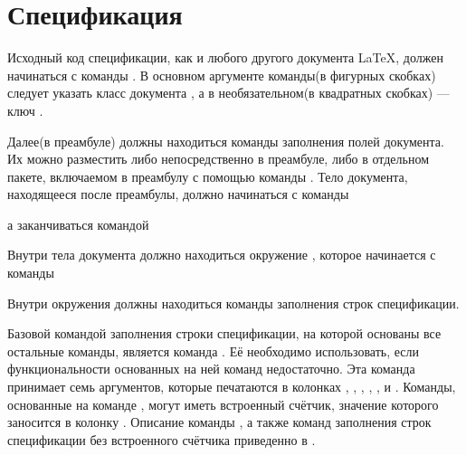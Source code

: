 
\section{Спецификация}

Исходный код спецификации, как и любого другого документа \LaTeX{}, должен
начинаться с команды . В основном аргументе
команды(в фигурных скобках) следует указать класс документа , а в
необязательном(в квадратных скобках) --- ключ .


Далее(в преамбуле) должны находиться команды заполнения полей документа. Их можно
разместить либо непосредственно в преамбуле, либо в отдельном пакете, включаемом в
преамбулу с помощью команды . Тело документа,
находящееся после преамбулы, должно начинаться с команды

\begin{pcbdoccode}

\end{pcbdoccode}

а заканчиваться командой

\begin{pcbdoccode}

\end{pcbdoccode}

Внутри тела документа должно находиться
окружение , которое начинается с команды

\begin{pcbdoccode}
\end{pcbdoccode}

Внутри окружения  должны находиться команды заполнения строк
спецификации.

Базовой командой заполнения строки спецификации, на которой основаны все остальные
команды, является команда . Её необходимо использовать,
если функциональности основанных на ней команд недостаточно. Эта команда принимает семь
аргументов, которые печатаются в колонках
, ,
, ,
,  и
. Команды, основанные на
команде , могут иметь встроенный счётчик, значение которого
заносится в колонку . Описание команды
, а также команд заполнения строк спецификации без
встроенного счётчика приведенно в .

